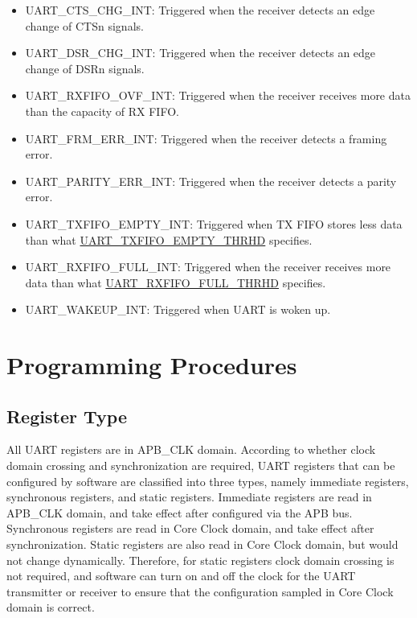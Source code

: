 \documentclass[main\_\_EN.tex]{subfiles}
\begin{document}
\begin{itemize}
\item \label{int:UARTCTSCHGINT}UART\_CTS\_CHG\_INT: Triggered when the receiver detects an edge change of CTSn signals.
\item \label{int:UARTDSRCHGINT}UART\_DSR\_CHG\_INT: Triggered when the receiver detects an edge change of DSRn signals.
\item \label{int:UARTRXFIFOOVFINT}UART\_RXFIFO\_OVF\_INT: Triggered when the receiver receives more data than the capacity of RX FIFO.
\item \label{int:UARTFRMERRINT}UART\_FRM\_ERR\_INT: Triggered when the receiver detects a framing error.
\item \label{int:UARTPARITYERRINT}UART\_PARITY\_ERR\_INT: Triggered when the receiver detects a parity error.
\item \label{int:UARTTXFIFOEMPTYINT}UART\_TXFIFO\_EMPTY\_INT: Triggered when TX FIFO stores less data than what \hyperref[fielddesc:UARTTXFIFOEMPTYTHRHD]{UART\_TXFIFO\_EMPTY\_THRHD} specifies.
\item \label{int:UARTRXFIFOFULLINT}UART\_RXFIFO\_FULL\_INT: Triggered when the receiver receives more data than what \hyperref[fielddesc:UARTRXFIFOFULLTHRHD]{UART\_RXFIFO\_FULL\_THRHD} specifies.
\item \label{int:UARTWAKEUPINT}UART\_WAKEUP\_INT: Triggered when UART is woken up.
\end{itemize}



\section{Programming Procedures}\label{sec:uart-program}

\subsection{Register Type}

All UART registers are in APB\_CLK domain. According to whether clock domain crossing and synchronization are required, UART registers that can be configured by software are classified into three types, namely immediate registers, synchronous registers, and static registers. Immediate registers are read in APB\_CLK domain, and take effect after configured via the APB bus. Synchronous registers are read in Core Clock domain, and take effect after synchronization. Static registers are also read in Core Clock domain, but would not change dynamically. Therefore, for static registers clock domain crossing is not required, and software can turn on and off the clock for the UART transmitter or receiver to ensure that the configuration sampled in Core Clock domain is correct.
\end{document}
